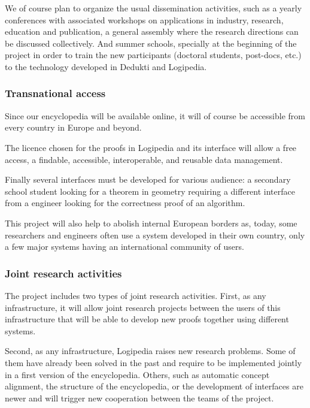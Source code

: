 We of course plan to organize the usual dissemination activities, such
as a yearly conferences with associated workshops on applications in
industry, research, education and publication, a general assembly
where the research directions can be discussed collectively. And
summer schools, specially at the beginning of the project in order to
train the new participants (doctoral students, post-docs, etc.) to the
technology developed in Dedukti and Logipedia.

\subsubsection{Transnational access}

Since our encyclopedia will be available online, it will of course be
accessible from every country in Europe and beyond.

The licence chosen for the proofs in {\sf Logipedia} and its interface
will allow a free access, a findable, accessible, interoperable, and
reusable data management.

Finally several interfaces must be developed for various audience: a
secondary school student looking for a theorem in geometry requiring a
different interface from a engineer looking for the correctness proof
of an algorithm.

This project will also help to abolish internal European borders as,
today, some researchers and engineers often use a system developed in
their own country, only a few major systems having an international
community of users.

\subsubsection{Joint research activities}

The project includes two types of joint research activities.  First,
as any infrastructure, it will allow joint research projects
between the users of this infrastructure that will be able to develop
new proofs together using different systems.

Second, as any infrastructure, {\sf Logipedia} raises new research
problems. Some of them have already been solved in the past and
require to be implemented jointly in a first version of the
encyclopedia. Others, such as automatic concept alignment, the
structure of the encyclopedia, or the development of interfaces are
newer and will trigger new cooperation between the teams of the
project.

